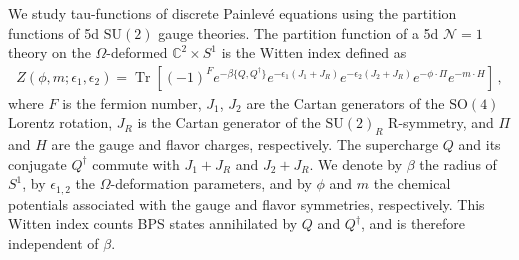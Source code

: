 \documentclass[11pt, a4paper]{article}
\DeclareMathOperator{\Tr}{Tr}
\theoremstyle{definition}
\begin{document}
We study tau-functions of discrete Painlev\'e equations using the partition functions of 5d $ \mathrm{SU}(2) $ gauge theories. The partition function of a 5d $ \mathcal{N}=1 $ theory on the $ \Omega $-deformed $ \mathbb{C}^2 \times S^1 $ is the Witten index defined as \cite{Nekrasov:2002qd}
\begin{align}\label{eq:Z}
    Z(\phi, m; \epsilon_1, \epsilon_2) = \Tr\left[ (-1)^F e^{-\beta\{Q,Q^\dagger\}} e^{-\epsilon_1(J_1+J_R)} e^{-\epsilon_2(J_2+J_R)} e^{-\phi \cdot \Pi} e^{-m \cdot H} \right] \, ,
\end{align}
where $ F $ is the fermion number, $ J_1 $, $ J_2 $ are the Cartan generators of the $ \mathrm{SO}(4) $ Lorentz rotation, $ J_R $ is the Cartan generator of the $ \mathrm{SU}(2)_R $ R-symmetry, and $ \Pi $ and $ H $ are the gauge and flavor charges, respectively. The supercharge $ Q $ and its conjugate $ Q^\dagger $ commute with $ J_1+J_R $ and $ J_2+J_R $. We denote by $ \beta $ the radius of $ S^1 $, by $ \epsilon_{1,2} $ the $ \Omega $-deformation parameters, and by $ \phi $ and $ m $ the chemical potentials associated with the gauge and flavor symmetries, respectively. This Witten index counts BPS states annihilated by $ Q $ and $ Q^\dagger $, and is therefore independent of $ \beta $.
\end{document}
